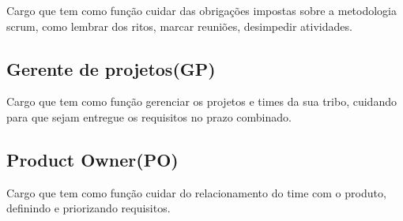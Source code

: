Cargo que tem como função cuidar das obrigações impostas sobre a metodologia scrum, como lembrar dos ritos, marcar reuniões, desimpedir atividades.

\subsection{Gerente de projetos(GP)}

Cargo que tem como função gerenciar os projetos e times da sua
 tribo, cuidando para que sejam entregue os requisitos no prazo combinado.

\subsection{Product Owner(PO)}
Cargo que tem como função cuidar do relacionamento do time com o produto,
 definindo e priorizando requisitos.